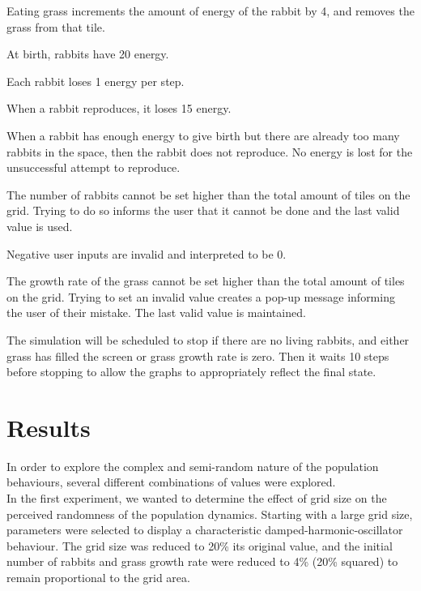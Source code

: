 \documentclass[11pt]{article}
\begin{document}
\begin{compactenum}
	\item Eating grass increments the amount of energy of the rabbit by 4, and removes the grass from that tile.
	\item At birth, rabbits have 20 energy.
	\item Each rabbit loses 1 energy per step.
	\item When a rabbit reproduces, it loses 15 energy.
	\item When a rabbit has enough energy to give birth but there are already too many rabbits in the space, then the rabbit does not reproduce. No energy is lost for the unsuccessful attempt to reproduce. 
	\item The number of rabbits cannot be set higher than the total amount of tiles on the grid. Trying to do so informs the user that it cannot be done and the last valid value is used.
	\item Negative user inputs are invalid and interpreted to be 0. 
	\item The growth rate of the grass cannot be set higher than the total amount of tiles on the grid. Trying to set an invalid value creates a pop-up message informing the user of their mistake. The last valid value is maintained. 
	\item The simulation will be scheduled to stop if there are no living rabbits, and either grass has filled the screen or grass growth rate is zero. Then it waits 10 steps before stopping to allow the graphs to appropriately reflect the final state.\\
	
\end{compactenum}

\section{Results}
In order to explore the complex and semi-random nature of the population behaviours, several different combinations of values were explored.\\

In the first experiment, we wanted to determine the effect of grid size on the perceived randomness of the population dynamics. Starting with a large grid size, parameters were selected to display a characteristic damped-harmonic-oscillator behaviour. The grid size was reduced to 20\% its original value, and the initial number of rabbits and grass growth rate were reduced to 4\% (20\% squared) to remain proportional to the grid area.\\
\end{document}
